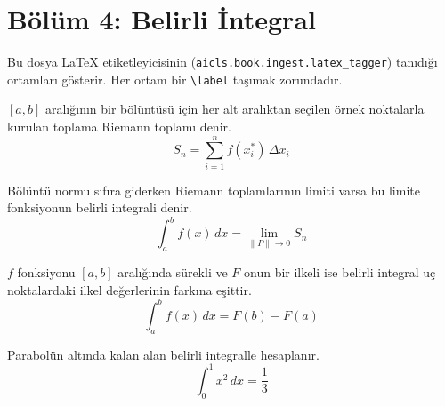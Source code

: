 \section{Bölüm 4: Belirli İntegral}

Bu dosya LaTeX etiketleyicisinin (\texttt{aicls.book.ingest.latex\_tagger})
tanıdığı ortamları gösterir. Her ortam bir \verb|\label| taşımak zorundadır.

\begin{tanim}\label{tanim:4.1}
$[a, b]$ aralığının bir bölüntüsü için her alt aralıktan seçilen örnek noktalarla
kurulan toplama Riemann toplamı denir.
\[
S_n = \sum_{i=1}^{n} f(x_i^*) \, \Delta x_i
\]
\end{tanim}

\begin{tanim}\label{tanim:4.2}
Bölüntü normu sıfıra giderken Riemann toplamlarının limiti varsa bu limite
fonksiyonun belirli integrali denir.
\[
\int_a^b f(x)\,dx = \lim_{\|P\| \to 0} S_n
\]
\end{tanim}

\begin{teorem}\label{teorem:4.3}
$f$ fonksiyonu $[a, b]$ aralığında sürekli ve $F$ onun bir ilkeli ise belirli
integral uç noktalardaki ilkel değerlerinin farkına eşittir.
\[
\int_a^b f(x)\,dx = F(b) - F(a)
\]
\end{teorem}

\begin{ornek}\label{ornek:4.4}
Parabolün altında kalan alan belirli integralle hesaplanır.
\[
\int_0^1 x^2 \, dx = \frac{1}{3}
\]
\end{ornek}
